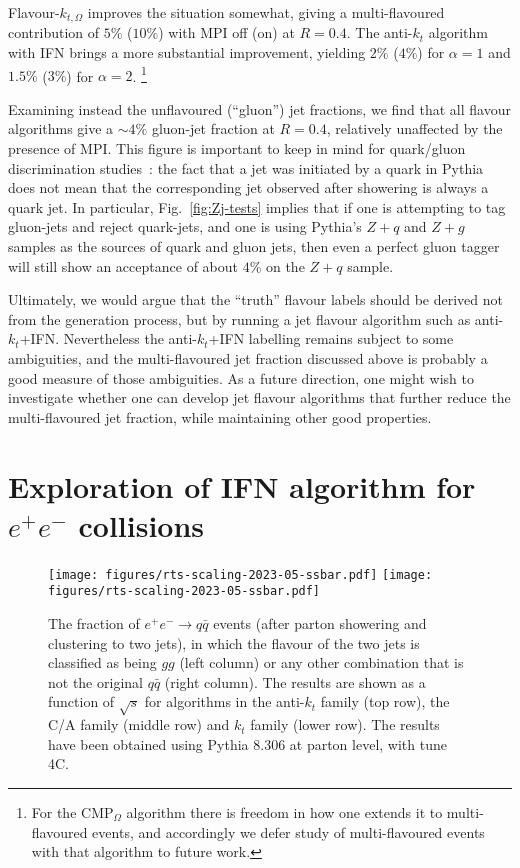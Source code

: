 \documentclass[nofootinbib,twocolumn,preprintnumbers,superscriptaddress,aps]{revtex4-2}
\begin{document}
Flavour-$k_{t,\Omega}$ improves the situation somewhat, giving a multi-flavoured contribution of $5\%$ ($10\%$)
with MPI off (on) at $R=0.4$.
%
The anti-$k_t$ algorithm with IFN brings a more
substantial improvement, yielding $2\%$ ($4\%$)
 for $\alpha=1$ and
$1.5\%$ ($3\%$)
 for $\alpha=2$.%
 \footnote{For the CMP$_\Omega$
  algorithm there is freedom in how one extends it to multi-flavoured
  events, and accordingly we defer study of multi-flavoured events
  with that algorithm to future work.}

Examining instead the unflavoured (``gluon'') jet fractions, we find
that all flavour algorithms give a $\sim 4\%$ gluon-jet fraction at
$R=0.4$, relatively unaffected by the presence of MPI. 
%
This figure is important to keep in mind for quark/gluon
discrimination studies~\cite{Gras:2017jty}: the fact
that a jet was initiated by a quark in Pythia does not mean that the
corresponding jet observed after showering is always a quark jet.
%
In particular, Fig.~\ref{fig:Zj-tests} implies that if one is
attempting to tag gluon-jets and reject quark-jets, and one is using
Pythia's $Z+q$ and $Z+g$ samples as the sources of quark and gluon
jets, then even a perfect gluon tagger will still show an acceptance
of about $4\%$ on the $Z+q$ sample.


Ultimately, we would argue that the ``truth'' flavour labels should be
derived not from the generation process, but by running a jet flavour
algorithm such as anti-$k_t$+IFN.
%
Nevertheless the anti-$k_t$+IFN labelling remains subject to some
ambiguities, and the multi-flavoured jet fraction discussed above is
probably a good measure of those ambiguities.
%
As a future direction, one might wish to investigate whether one can develop jet
flavour algorithms that further reduce the multi-flavoured jet
fraction, while maintaining other good properties.


\section{Exploration of IFN algorithm for $e^+e^-$ collisions}
\label{sec:ee-generalisations}

\begin{figure*}
  \centering
  \texttt{[image: figures/rts-scaling-2023-05-ssbar.pdf]}\hfill
  \texttt{[image: figures/rts-scaling-2023-05-ssbar.pdf]}
  \caption{
    The fraction of $e^+e^- \to q\bar q$ events (after
    parton showering and 
    clustering to two jets), in which the flavour of the two jets is classified as being
    $gg$ (left column) or any other combination that is not the original $q\bar q$ (right column).
    The results are shown as a function of $\sqrt{s}$ for
    algorithms in the anti-$k_t$ family (top row), the C/A family (middle
    row) and $k_t$ family (lower row).
    The results have been obtained using Pythia 8.306 at parton level,
    with tune 4C.
  }
  \label{fig:ee-rts-scaling}
\end{figure*}
\end{document}
